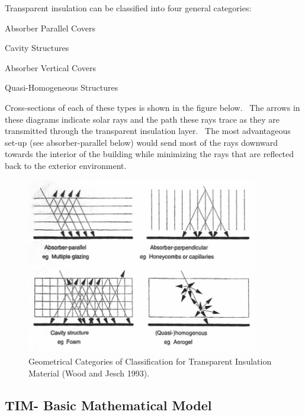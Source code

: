 Transparent insulation can be classified into four general categories:

Absorber Parallel Covers

Cavity Structures

Absorber Vertical Covers

Quasi-Homogeneous Structures

Cross-sections of each of these types is shown in the figure below.~ The arrows in these diagrams indicate solar rays and the path these rays trace as they are transmitted through the transparent insulation layer.~ The most advantageous set-up (see absorber-parallel below) would send most of the rays downward towards the interior of the building while minimizing the rays that are reflected back to the exterior environment.

\begin{figure}[hbtp] %
\centering
\includegraphics[width=0.9\textwidth, height=0.9\textheight, keepaspectratio=true]{media/image400.png}
\caption{  Geometrical Categories of Classification for Transparent Insulation Material (Wood and Jesch 1993). \protect \label{fig:geometrical-categories-of-classification-for}}
\end{figure}

\subsection{TIM- Basic Mathematical Model}\label{tim--basic-mathematical-model}

